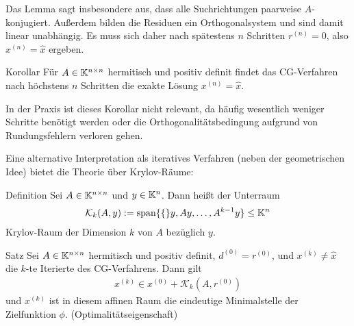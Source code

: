 Das Lemma sagt insbesondere aus, dass alle Suchrichtungen paarweise $A$-konjugiert. Außerdem bilden 
die Residuen ein Orthogonalsystem und sind damit linear unabhängig.
Es muss sich daher nach spätestens $n$ Schritten $r^{(n)}=0$, also $x^{(n)}=\hat{x}$ ergeben.

\begin{colbox}{Korollar}\label{cor:CGVconvn}
  Für $A\in\mathbb K^{n\times n}$ hermitisch und positiv definit findet das CG-Verfahren nach 
  höchstens $n$ Schritten die exakte Lösung $x^{(n)}=\hat{x}$.
\end{colbox}

In der Praxis ist dieses Korollar nicht relevant, da häufig wesentlich weniger Schritte benötigt werden oder die 
Orthogonalitätsbedingung aufgrund von Rundungsfehlern verloren gehen.

Eine alternative Interpretation als iteratives Verfahren (neben der geometrischen Idee) bietet die Theorie über 
Krylov-Räume:

\begin{colbox}{Definition}
  Sei $A\in\mathbb K^{n\times n}$ und $y\in\mathbb K^n$. Dann heißt der Unterraum 
  \begin{align*}
    \mathcal{K}_k(A,y) := \text{span}\{\{\}y,Ay,\dots,A^{k-1}y\}\leq \mathbb K^n
  \end{align*} 
  Krylov-Raum der Dimension $k$ von $A$ bezüglich $y$.
\end{colbox}

\begin{colbox}{Satz}\label{satz:CGVkrylov}
  Sei $A\in\mathbb K^{n\times n}$ hermitisch und positiv definit, $d^{(0)}=r^{(0)}$, und $x^{(k)}\neq \hat{x}$ 
  die $k$-te Iterierte des CG-Verfahrens. 
  Dann gilt 
  \begin{align*}
    x^{(k)}\in x^{(0)} + \mathcal{K}_k(A,r^{(0)})
  \end{align*}
  und $x^{(k)}$ ist 
  in diesem affinen Raum die eindeutige Minimalstelle der Zielfunktion $\phi$. (Optimalitätseigenschaft)
\end{colbox}

